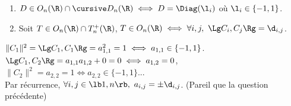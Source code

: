 \documentclass[11pt]{article}
\begin{document}
\vspace*{-0.7cm}

\begin{exercice}{}{}
    \begin{enumerate}
        \item $D\in O_n(\R)\cap\D_n(\R)\iff D=\Diag(\l_i)$ où $\l_i\in\{-1,1\}$.
        \item Soit $T\in O_n(\R)\cap T_n^+(\R)$, $T\in O_n(\R)\iff \forall i,j, ~ \Lg C_i, C_j \Rg = \d_{i,j}$.
    \end{enumerate}
    \tcblower
     $\|C_1\|^2=\Lg C_1,C_1\Rg = a_{1,1}^2=1 \iff a_{1,1}\in\{-1,1\}$.\\
    $\Lg C_1,C_2\Rg=a_{1,1}a_{1,2}+0=0\iff a_{1,2}=0$, $\|C_2\|^2=a_{2,2}=1\iff a_{2,2}\in\{-1,1\}$...\\
    Par récurrence, $\forall i,j \in \lb1,n\rb, ~ a_{i,j}=\pm\d_{i,j}$. (Pareil que la question précédente)
\end{exercice}
\end{document}
